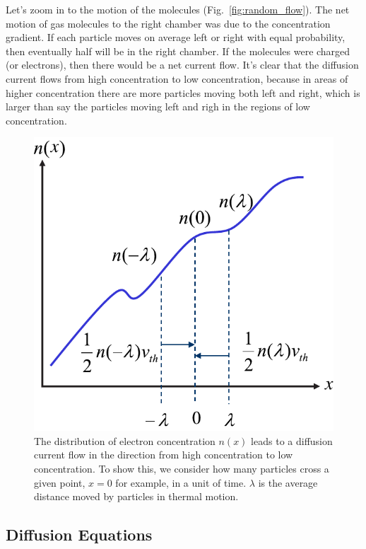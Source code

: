 Let’s zoom in to the motion of the molecules (Fig.~\ref{fig:random_flow}).  The net motion of gas molecules to the right chamber was due to the concentration gradient.
If each particle moves on average left or right with equal probability, then eventually half will be in the right chamber. If the molecules were charged (or electrons), then there would be a net current flow.  It's clear that the diffusion current flows from high concentration to low concentration, because in areas of higher concentration there are more particles moving both left and right, which is larger than say the particles moving left and righ in the regions of low concentration.




\begin{figure}[tb]
\begin{center}
\includegraphics[width=.45\columnwidth]{slide48}
\end{center}
\caption{The distribution of electron concentration $n(x)$ leads to a diffusion current flow in the direction from high concentration to low concentration.  To show this, we consider how many particles cross a given point, $x=0$ for example, in a unit of time.  $\lambda$ is the average distance moved by particles in thermal motion. } \label{fig:slide48}
\end{figure}


\subsection{Diffusion Equations}

